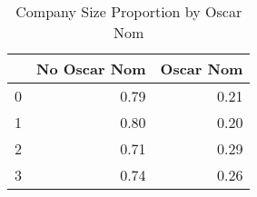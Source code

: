 \begin{table}[H]
\centering
\begin{tabular}{rrr}
  \hline
 & No Oscar Nom & Oscar Nom \\ 
  \hline
0 & 0.79 & 0.21 \\ 
  1 & 0.80 & 0.20 \\ 
  2 & 0.71 & 0.29 \\ 
  3 & 0.74 & 0.26 \\ 
   \hline
\end{tabular}
\caption{Company Size Proportion by Oscar Nom} 
\label{tab:con}
\end{table}

